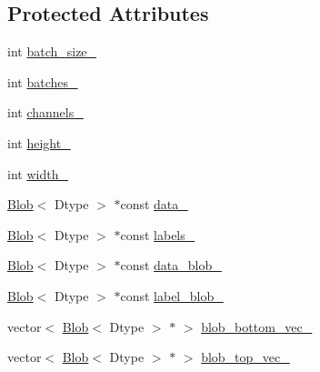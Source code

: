 \subsection*{Protected Attributes}
\begin{DoxyCompactItemize}
\item 
int \hyperlink{classcaffe_1_1_memory_data_layer_test_adf80053b8c93a68ec14207ed114bbf6c}{batch\+\_\+size\+\_\+}
\item 
int \hyperlink{classcaffe_1_1_memory_data_layer_test_ab5cdf08e300fc8ee97762b510403ea1d}{batches\+\_\+}
\item 
int \hyperlink{classcaffe_1_1_memory_data_layer_test_a12cc813a56e6ed0f8f9a341f37adb87b}{channels\+\_\+}
\item 
int \hyperlink{classcaffe_1_1_memory_data_layer_test_ac6f8872f971ff23b79987a812cf6dcac}{height\+\_\+}
\item 
int \hyperlink{classcaffe_1_1_memory_data_layer_test_a3488d10fa611d4deadbf238c288e1572}{width\+\_\+}
\item 
\hyperlink{classcaffe_1_1_blob}{Blob}$<$ Dtype $>$ $\ast$const \hyperlink{classcaffe_1_1_memory_data_layer_test_ad0a921772812e73a2039abb85ffe9968}{data\+\_\+}
\item 
\hyperlink{classcaffe_1_1_blob}{Blob}$<$ Dtype $>$ $\ast$const \hyperlink{classcaffe_1_1_memory_data_layer_test_a2a1b780a38e483da5da7de0852406b0f}{labels\+\_\+}
\item 
\hyperlink{classcaffe_1_1_blob}{Blob}$<$ Dtype $>$ $\ast$const \hyperlink{classcaffe_1_1_memory_data_layer_test_a4b580c8596ec6ce0811a3b785006c9fe}{data\+\_\+blob\+\_\+}
\item 
\hyperlink{classcaffe_1_1_blob}{Blob}$<$ Dtype $>$ $\ast$const \hyperlink{classcaffe_1_1_memory_data_layer_test_a60268033c066e92f4ba6f7b1fa796ab1}{label\+\_\+blob\+\_\+}
\item 
vector$<$ \hyperlink{classcaffe_1_1_blob}{Blob}$<$ Dtype $>$ $\ast$ $>$ \hyperlink{classcaffe_1_1_memory_data_layer_test_abd3b727ea9e820961deab300840f65a8}{blob\+\_\+bottom\+\_\+vec\+\_\+}
\item 
vector$<$ \hyperlink{classcaffe_1_1_blob}{Blob}$<$ Dtype $>$ $\ast$ $>$ \hyperlink{classcaffe_1_1_memory_data_layer_test_ac33a7be28ca9fd66a9981645de4b4423}{blob\+\_\+top\+\_\+vec\+\_\+}
\end{DoxyCompactItemize}


